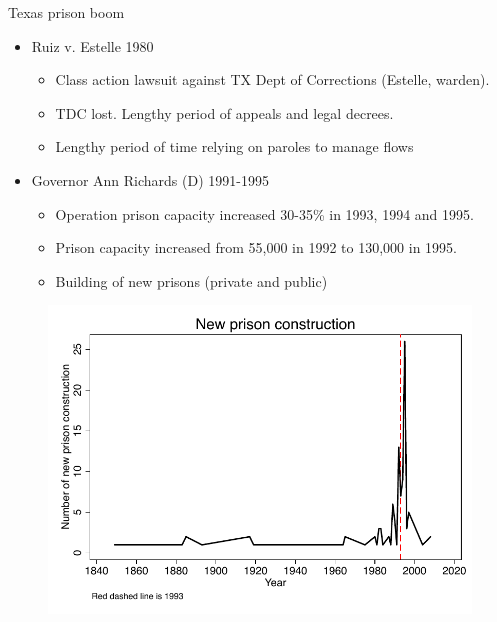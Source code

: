 \documentclass{beamer}
\begin{document}
\begin{frame}{Texas prison boom}

	
	\begin{itemize}
	\item Ruiz v. Estelle 1980  
		\begin{itemize}
		\item Class action lawsuit against TX Dept of Corrections (Estelle, warden). 
		\item TDC lost.  Lengthy period of appeals and legal decrees.  
		\item Lengthy period of time relying on paroles to manage flows
		\end{itemize}
	\item Governor Ann Richards (D) 1991-1995
		\begin{itemize}
		\item Operation prison capacity increased 30-35\% in 1993, 1994 and 1995. 
		\item Prison capacity increased from 55,000 in 1992 to 130,000 in 1995.  
		\item Building of new prisons (private and public)
		\end{itemize} 
	\end{itemize}
\end{frame}

\begin{frame}[shrink=30,plain]

\begin{figure}
\includegraphics{./lecture_includes/tdcj.pdf}
\end{figure}
\end{frame}
\end{document}

